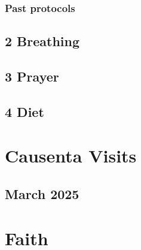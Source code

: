 \documentclass[
  letterpaper,
  DIV=11,
  numbers=noendperiod]{scrreprt}
\begin{document}
\section{Past protocols}\label{past-protocols}

\chapter{2 Breathing}\label{breathing}

\chapter{3 Prayer}\label{prayer}

\chapter{4 Diet}\label{diet}

\part{Causenta Visits}

\chapter{March 2025}\label{march-2025}

\part{Faith}
\end{document}
